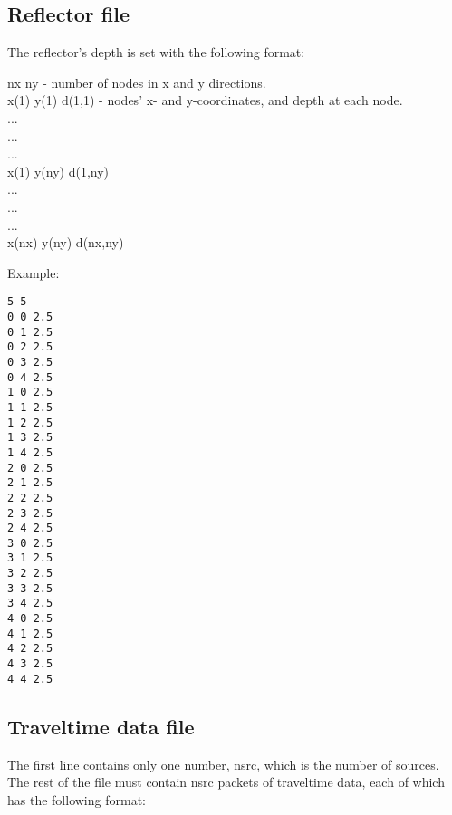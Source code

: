 \documentclass[twoside,final,onecolumn]{article}
\begin{document}
\subsection{Reflector file}
The reflector's depth is set with the following format:

\begin{framed}
\noindent nx ny \qquad\qquad\hphantom{y(1) d(1,1}- number of nodes in x and y directions.\\
x(1) y(1) d(1,1) \qquad\qquad- nodes' x- and y-coordinates, and depth at each node.\\
.\hphantom{x(1)-}.\hphantom{y(ny)-}.\\
.\hphantom{x(1)-}.\hphantom{y(ny)-}.\\
.\hphantom{x(1)-}.\hphantom{y(ny)-}.\\
x(1) y(ny) d(1,ny)\\
.\hphantom{x(1)---}.\hphantom{y(ny)--}.\\
.\hphantom{x(1)---}.\hphantom{y(ny)--}.\\
.\hphantom{x(1)---}.\hphantom{y(ny)--}.\\
x(nx) y(ny) d(nx,ny)
\end{framed}

Example:

\begin{verbatim}
5 5
0 0 2.5
0 1 2.5
0 2 2.5
0 3 2.5
0 4 2.5
1 0 2.5
1 1 2.5
1 2 2.5
1 3 2.5
1 4 2.5
2 0 2.5
2 1 2.5
2 2 2.5
2 3 2.5
2 4 2.5
3 0 2.5
3 1 2.5
3 2 2.5
3 3 2.5
3 4 2.5
4 0 2.5
4 1 2.5
4 2 2.5
4 3 2.5
4 4 2.5
\end{verbatim}

\subsection{Traveltime data file}
The first line contains only one number, nsrc, which is the number of sources.
The rest of the file must contain nsrc packets of traveltime data, each of which has the following format:
\end{document}
